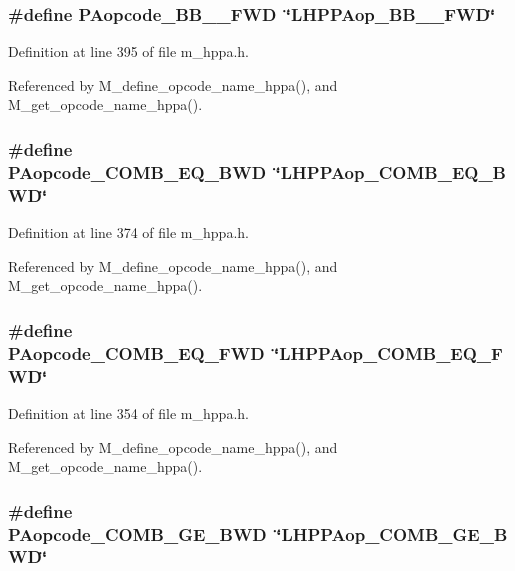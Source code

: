 \subsubsection{\setlength{\rightskip}{0pt plus 5cm}\#define PAopcode\_\-BB\_\_\-FWD~\char`\"{}LHPPAop\_\-BB\_\_\-FWD\char`\"{}}\label{m__hppa_8h_e9123dce8125037e105fb7c28a594789}




Definition at line 395 of file m\_\-hppa.h.

Referenced by M\_\-define\_\-opcode\_\-name\_\-hppa(), and M\_\-get\_\-opcode\_\-name\_\-hppa().
\subsubsection{\setlength{\rightskip}{0pt plus 5cm}\#define PAopcode\_\-COMB\_\-EQ\_\-BWD~\char`\"{}LHPPAop\_\-COMB\_\-EQ\_\-BWD\char`\"{}}\label{m__hppa_8h_e2f8a2f6482435ba68e299c99c9d711f}




Definition at line 374 of file m\_\-hppa.h.

Referenced by M\_\-define\_\-opcode\_\-name\_\-hppa(), and M\_\-get\_\-opcode\_\-name\_\-hppa().
\subsubsection{\setlength{\rightskip}{0pt plus 5cm}\#define PAopcode\_\-COMB\_\-EQ\_\-FWD~\char`\"{}LHPPAop\_\-COMB\_\-EQ\_\-FWD\char`\"{}}\label{m__hppa_8h_1425e0a28a501d14456a510a9c306294}




Definition at line 354 of file m\_\-hppa.h.

Referenced by M\_\-define\_\-opcode\_\-name\_\-hppa(), and M\_\-get\_\-opcode\_\-name\_\-hppa().
\subsubsection{\setlength{\rightskip}{0pt plus 5cm}\#define PAopcode\_\-COMB\_\-GE\_\-BWD~\char`\"{}LHPPAop\_\-COMB\_\-GE\_\-BWD\char`\"{}}\label{m__hppa_8h_1fb4a6b8c229110d0be3d11ed52755df}




